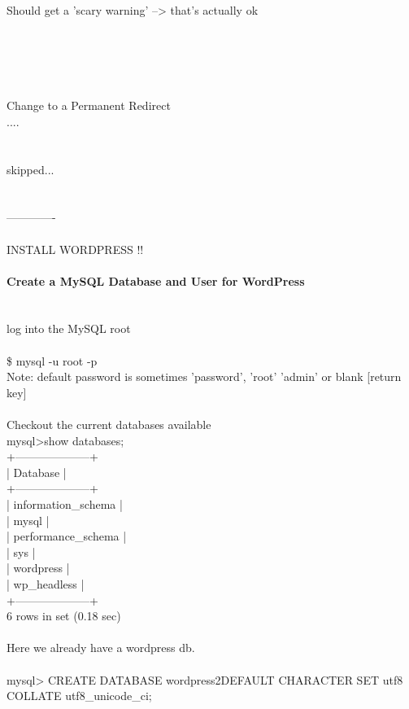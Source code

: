 \documentclass[10pt,a4paper]{article}
\begin{document}
{{{{{{{{{{{{{{{{\\
Should get a 'scary warning' --> that's actually ok\\
\\
\\
\\
\\
\\
Change to a Permanent Redirect\\
....\\
\\
\\
skipped...\\
\\
\\
-------------\\
\\
INSTALL WORDPRESS !!\\
\\
\textbf{Create a MySQL Database and User for WordPress}}{\large \\
\\
\\
log into the MySQL root\\
\\
\$ mysql -u root -p\\
Note: default password is sometimes 'password', 'root' 'admin' or blank [return key]\\
\\
Checkout the current databases available\\
mysql>show databases;\\
+--------------------+\\
| Database           |\\
+--------------------+\\
| information\_schema |\\
| mysql              |\\
| performance\_schema |\\
| sys                |\\
| wordpress          |\\
| wp\_headless        |\\
+--------------------+\\
6 rows in set (0.18 sec)\\
\\
Here we already have a wordpress db.\\
\\
mysql> CREATE DATABASE wordpress2}{\large  DEFAULT CHARACTER SET utf8 COLLATE utf8\_unicode\_ci;\\
}}}}}}}}}}}}}}}}
\end{document}
